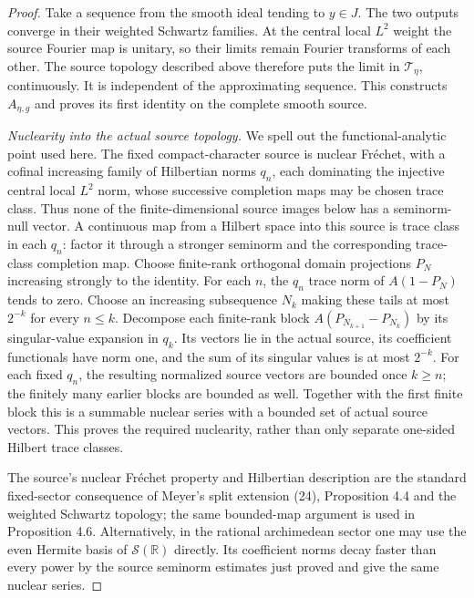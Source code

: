 \begin{proof}
Take a sequence from the smooth ideal tending to \(y\in J\).
The two outputs converge in their weighted Schwartz families.
At the central local \(L^2\) weight the source Fourier map is
unitary, so their limits remain Fourier transforms of each
other. The source topology described above therefore puts the
limit in \(\mathcal T_\eta\), continuously. It is independent
of the approximating sequence. This constructs \(A_{\eta,g}\)
and proves its first identity on the complete smooth source.

\emph{Nuclearity into the actual source topology.}
We spell out the functional-analytic point used here. The fixed
compact-character source is nuclear Fr\'echet, with a cofinal
increasing family of Hilbertian norms \(q_n\), each dominating
the injective central local \(L^2\) norm, whose successive
completion maps may be chosen trace class. Thus none of the
finite-dimensional source images below has a seminorm-null
vector. A
continuous map from a Hilbert space into this source is trace
class in each \(q_n\): factor it through a stronger seminorm
and the corresponding trace-class completion map. Choose
finite-rank orthogonal domain projections \(P_N\) increasing
strongly to the identity. For each \(n\), the \(q_n\)
trace norm of \(A(1-P_N)\) tends to zero. Choose an increasing
subsequence \(N_k\) making these tails at most \(2^{-k}\)
for every \(n\le k\). Decompose each finite-rank block
\(A(P_{N_{k+1}}-P_{N_k})\) by its singular-value expansion
in \(q_k\). Its vectors lie in the actual source, its
coefficient functionals have norm one, and the sum of its
singular values is at most \(2^{-k}\). For each fixed
\(q_n\), the resulting normalized source vectors are bounded
once \(k\ge n\); the finitely many earlier blocks are bounded
as well. Together with the first finite block this is a
summable nuclear series with a bounded set of actual source
vectors. This proves the required nuclearity, rather than
only separate one-sided Hilbert trace classes.

The source's nuclear Fr\'echet property and Hilbertian
description are the standard fixed-sector consequence of
Meyer's split extension (24), Proposition 4.4 and the
weighted Schwartz topology; the same bounded-map argument is
used in Proposition 4.6. Alternatively, in the rational
archimedean sector one may use the even Hermite basis of
\(\mathscr S(\mathbb R)\) directly. Its coefficient norms
decay faster than every power by the source seminorm estimates
just proved and give the same nuclear series.


\end{proof}
